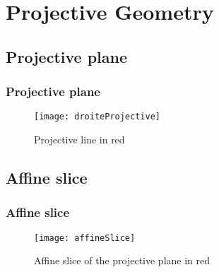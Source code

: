\section{Projective Geometry}

\subsection{Projective plane}

\begin{frame}[t]
    \frametitle{Projective plane}
        \begin{figure}[t]
            \centering
            \texttt{[image: droiteProjective]}
            \caption{Projective line in red}
            \label{fig:droiteProjective}
        \end{figure}
\end{frame}

\subsection{Affine slice}
\begin{frame}[t]
\frametitle{Affine slice}
\begin{figure}[h]
    \centering
    \texttt{[image: affineSlice]}
    \caption{Affine slice of the projective plane in red}
    \label{fig:affineSlice}
\end{figure}
\end{frame}

